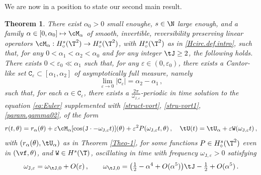 \documentclass[a4paper,reqno,10pt]{article}
\newtheorem{theo}{Theorem}[section]
\begin{document}
We are now in a position to state our second main result. 

\begin{theo}\label{Theo-2}
There exist $\alpha_0>0$ small enoughe, $s \in \N$ large enough, and a family $\alpha\in[0,\alpha_0]\mapsto \cM_{\alpha}$ of  smooth, invertible, reversibility preserving linear operators $\cM_{\alpha}:H_{\circ}^{s}(\T^2)\to H_{\circ}^{s}(\T^2)$, with $H_{\circ}^{s}(\T^2)$ as in \eqref{Hcirc.def.intro},  such that,  for any $0<\alpha_1<\alpha_2 < \alpha_{0}$ and for any integer $\tJ\geq 2$, the following holds.   There exists $0<\varepsilon_0 \ll \alpha_1$  such that, for any $\varepsilon \in (0,\varepsilon_0)$, there exists a Cantor-like set $\mathtt{C}_\varepsilon\subset [\alpha_{1},\alpha_{2}] $ of asymptotically full measure, namely
\begin{equation}\label{cantor.limit.theo2}
    \lim_{\varepsilon\to 0}|\mathtt{C}_\varepsilon|= \alpha_{2}-\alpha_{1}\,,
\end{equation}
such that, for each $\alpha \in\mathtt{C}_\varepsilon$, there exists a $\frac{2\pi}{\omega_{\mathtt{J,\varepsilon}}}$-periodic in time solution to the  equation \eqref{eq:Euler} supplemented with  \eqref{struct-vort}, \eqref{stru-vort1},  \eqref{param.gamma02}, of the form
\begin{equation}\label{sol.theo2}
     r(t,\theta)=r_\alpha(\theta)+\varepsilon\cM_{\alpha}[\cos (\mathtt{J}\cdot - \omega_{\mathtt{J,\varepsilon}}t)](\theta)+\varepsilon^2P(\omega_{\mathtt{J,\varepsilon}} t,\theta)\,,\quad 
\tU(t)= \tU_\alpha+\varepsilon\mathtt{W}(\omega_{\mathtt{J},\varepsilon} t)\,,
\end{equation}
with $(r_\alpha(\theta),\tU_{\alpha})$ as in Theorem \ref{Theo-1}, for some functions $P\in H_\circ^s(\T^2)$ even in $(\vf,\theta)$,  and $\mathtt{W}\in H^s(\T)$, oscillating in time with frequency $\omega_{\mathtt{J},\varepsilon}>0$ satisfying
\begin{equation}
    \omega_{\mathtt{J},\varepsilon}
		=\omega_{\tJ,0}+O(\varepsilon)\,,
		\qquad
		\omega_{\tJ,0}=
 \big(\tfrac12 -  \alpha^4 +O(\alpha^5) \big)\tJ - \tfrac12 + O(\alpha^5)\,. 
\end{equation}
\end{theo}
\end{document}
